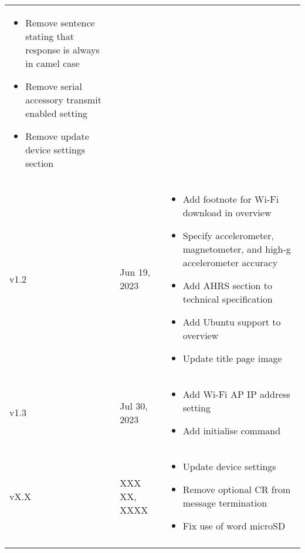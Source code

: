 \begin{longtable}{| >{\centering}p{} | p{} | >{\raggedright\arraybackslash}p{} |}
\begin{itemize}
			\item Remove sentence stating that response is always in camel case
            \item Remove serial accessory transmit enabled setting
            \item Remove update device settings section
        \end{itemize}\\
        v1.2 & Jun 19, 2023 &
        \begin{itemize}
			\item Add footnote for Wi-Fi download in overview
			\item Specify accelerometer, magnetometer, and high-g accelerometer accuracy
			\item Add AHRS section to technical specification
			\item Add Ubuntu support to overview
			\item Update title page image
        \end{itemize}\\
        v1.3 & Jul 30, 2023 &
        \begin{itemize}
			\item Add Wi-Fi \ac{AP} \ac{IP} address setting
			\item Add initialise command
        \end{itemize}\\
        vX.X & XXX XX, XXXX &
        \begin{itemize}
			\item Update device settings
			\item Remove optional CR from message termination
			\item Fix use of word \ac{microSD}
		\end{itemize}\\
        \arrayrulecolor{gray!50}\hline
    \end{longtable}
\endgroup
